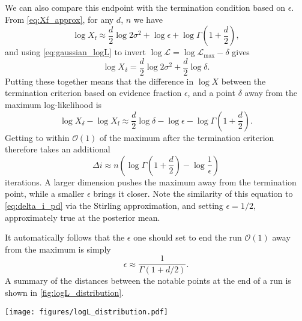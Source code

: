 \documentclass[usenatbib]{mnras}
\newcommand{\Like}{\mathcal{L}}
\newcommand{\logLmax}{\log \Like_\mathrm{max}}
\begin{document}
\par
We can also compare this endpoint with the termination condition based on $\epsilon$. From \cref{eq:Xf_approx}, for any $d$, $n$ we have
\begin{equation}
    \log X_\mathrm{f} \approx \frac{d}{2}\log 2\sigma^2 + \log\epsilon + \log\Gamma\left(1+\frac{d}{2}\right),
\end{equation}
and using \cref{eq:gaussian_logL} to invert $\log\Like = \logLmax-\delta$ gives
\begin{equation}
    \log X_\delta=\frac{d}{2}\log 2\sigma^2+\frac{d}{2}\log\delta.
\end{equation}
Putting these together means that the difference in $\log X$ between the termination criterion based on evidence fraction $\epsilon$, and a point $\delta$ away from the maximum log-likelihood is
\begin{equation}
    \log X_\delta - \log X_\mathrm{f} \approx \frac{d}{2}\log\delta - \log\epsilon - \log\Gamma\left(1+\frac{d}{2}\right).
\end{equation}
Getting to within $\mathcal{O}(1)$ of the maximum after the termination criterion therefore takes an additional
 \begin{equation}
     \Delta i \approx n \left(\log\Gamma\left(1+\frac{d}{2}\right) - \log\frac{1}{\epsilon}\right)
\end{equation}
iterations. A larger dimension pushes the maximum away from the termination point, while a smaller $\epsilon$ brings it closer. Note the similarity of this equation to \cref{eq:delta_i_pd} via the Stirling approximation, and setting $\epsilon = 1/2$, approximately true at the posterior mean. 
\par
It automatically follows that the $\epsilon$ one should set to end the run $\mathcal{O}(1)$ away from the maximum is simply
\begin{equation}
    \boxed{\epsilon \approx \frac{1}{\Gamma\left(1 + d/2\right)}}.
\end{equation}
A summary of the distances between the notable points at the end of a run is shown in \cref{fig:logL_distribution}.

\begin{figure*}
\begin{center}
    \texttt{[image: figures/logL\_distribution.pdf]}
\end{center}
\caption{Distribution of samples as a function of $\log\mathcal{L}$, showing the posterior $\mathcal{P}(\log\mathcal{L})$, the distribution of the live points $\mathcal{\pi}(\log\mathcal{L} \mid \mathcal{L}>\mathcal{L}_i)$, and the distribution of the maximum likelihood live point $P(\log\mathcal{L}_\mathrm{max}^\mathrm{live})$. The distances are shown between these locations at the end of the run, the key takeaway being that in high dimensions the highest log-likelihood point of a nested sampling run is nowhere near the maximum in high dimensions.}
\label{fig:logL_distribution}
\end{figure*}
\end{document}
